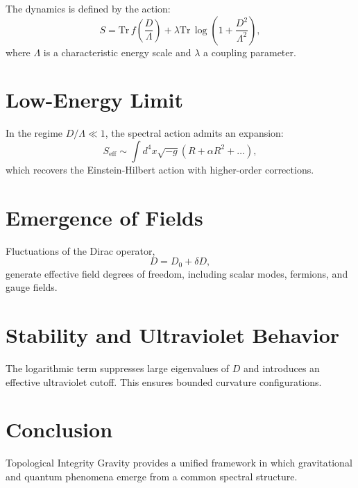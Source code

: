 \documentclass[11pt,a4paper]{article}
\begin{document}
The dynamics is defined by the action:
\begin{equation}
S = \mathrm{Tr}\, f\left(\frac{D}{\Lambda}\right) + \lambda \mathrm{Tr}\,\log\left(1 + \frac{D^2}{\Lambda^2}\right),
\end{equation}
where $\Lambda$ is a characteristic energy scale and $\lambda$ a coupling parameter.

\section{Low-Energy Limit}

In the regime $D/\Lambda \ll 1$, the spectral action admits an expansion:
\begin{equation}
S_{\mathrm{eff}} \sim \int d^4x \sqrt{-g} \left( R + \alpha R^2 + \dots \right),
\end{equation}
which recovers the Einstein-Hilbert action with higher-order corrections.

\section{Emergence of Fields}

Fluctuations of the Dirac operator,
\begin{equation}
D = D_0 + \delta D,
\end{equation}
generate effective field degrees of freedom, including scalar modes, fermions, and gauge fields.

\section{Stability and Ultraviolet Behavior}

The logarithmic term suppresses large eigenvalues of $D$ and introduces an effective ultraviolet cutoff. This ensures bounded curvature configurations.

\section{Conclusion}

Topological Integrity Gravity provides a unified framework in which gravitational and quantum phenomena emerge from a common spectral structure.
\end{document}
